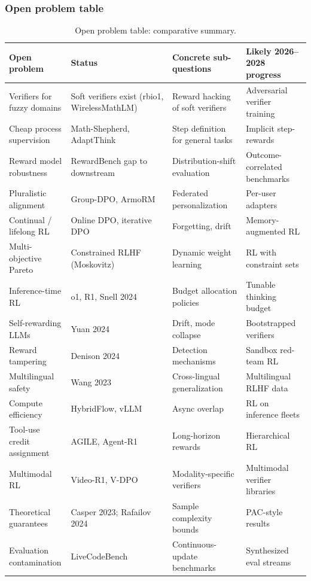 \documentclass{article}
\begin{document}
\subsubsection{Open problem table}\label{open-problem-table}

\begin{table}[t]
\centering
\caption{Open problem table: comparative summary.}
\label{tab:open-problem-table}
\begin{tabular}{>{\raggedright\arraybackslash}p{0.2030\linewidth}
  >{\raggedright\arraybackslash}p{0.3308\linewidth}
  >{\raggedright\arraybackslash}p{0.2481\linewidth}
  >{\raggedright\arraybackslash}p{0.2180\linewidth}}
\toprule
Open problem & Status & Concrete sub-questions & Likely 2026--2028 progress \\
\midrule
Verifiers for fuzzy domains & Soft verifiers exist (rbio1, WirelessMathLM) & Reward hacking of soft verifiers & Adversarial verifier training \\
Cheap process supervision & Math-Shepherd, AdaptThink & Step definition for general tasks & Implicit step-rewards \\
Reward model robustness & RewardBench gap to downstream & Distribution-shift evaluation & Outcome-correlated benchmarks \\
Pluralistic alignment & Group-DPO, ArmoRM & Federated personalization & Per-user adapters \\
Continual / lifelong RL & Online DPO, iterative DPO & Forgetting, drift & Memory-augmented RL \\
Multi-objective Pareto & Constrained RLHF (Moskovitz) & Dynamic weight learning & RL with constraint sets \\
Inference-time RL & o1, R1, Snell 2024 & Budget allocation policies & Tunable thinking budget \\
Self-rewarding LLMs & Yuan 2024 & Drift, mode collapse & Bootstrapped verifiers \\
Reward tampering & Denison 2024 & Detection mechanisms & Sandbox red-team RL \\
Multilingual safety & Wang 2023 & Cross-lingual generalization & Multilingual RLHF data \\
Compute efficiency & HybridFlow, vLLM & Async overlap & RL on inference fleets \\
Tool-use credit assignment & AGILE, Agent-R1 & Long-horizon rewards & Hierarchical RL \\
Multimodal RL & Video-R1, V-DPO & Modality-specific verifiers & Multimodal verifier libraries \\
Theoretical guarantees & Casper 2023; Rafailov 2024 & Sample complexity bounds & PAC-style results \\
Evaluation contamination & LiveCodeBench & Continuous-update benchmarks & Synthesized eval streams \\
\end{tabular}
\end{table}
\end{document}

